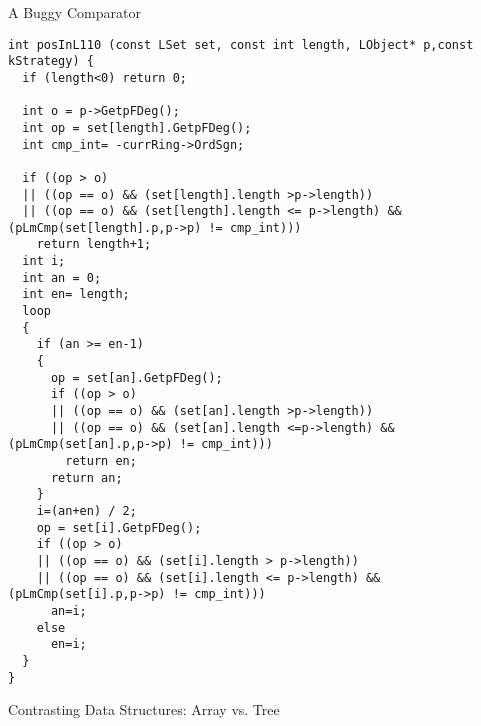 \documentclass[11pt]{beamer}
\begin{document}
\begin{frame}[fragile]{A Buggy Comparator}
\tiny\begin{verbatim}
int posInL110 (const LSet set, const int length, LObject* p,const kStrategy) {
  if (length<0) return 0;

  int o = p->GetpFDeg();
  int op = set[length].GetpFDeg();
  int cmp_int= -currRing->OrdSgn;

  if ((op > o)
  || ((op == o) && (set[length].length >p->length))
  || ((op == o) && (set[length].length <= p->length) && (pLmCmp(set[length].p,p->p) != cmp_int)))
    return length+1;
  int i;
  int an = 0;
  int en= length;
  loop
  {
    if (an >= en-1)
    {
      op = set[an].GetpFDeg();
      if ((op > o)
      || ((op == o) && (set[an].length >p->length))
      || ((op == o) && (set[an].length <=p->length) && (pLmCmp(set[an].p,p->p) != cmp_int)))
        return en;
      return an;
    }
    i=(an+en) / 2;
    op = set[i].GetpFDeg();
    if ((op > o)
    || ((op == o) && (set[i].length > p->length))
    || ((op == o) && (set[i].length <= p->length) && (pLmCmp(set[i].p,p->p) != cmp_int)))
      an=i;
    else
      en=i;
  }
}
\end{verbatim}
\end{frame}

\begin{frame}{Contrasting Data Structures: Array vs. Tree}
\centering
{}
\end{frame}
\end{document}
